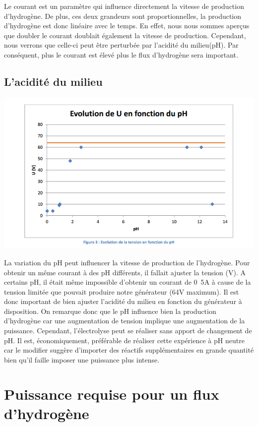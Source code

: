 \documentclass[10pt,a4paper]{article}
\begin{document}
Le courant est un paramètre qui influence directement la vitesse de production d'hydrogène. De plus, ces deux grandeurs sont proportionnelles, la production d'hydrogène est donc linéaire avec le temps. En effet, nous nous sommes aperçus que doubler le courant doublait également la vitesse de production. Cependant, nous verrons que celle-ci peut être perturbée par l'acidité du milieu(pH). Par conséquent, plus le courant est élevé plus le flux d'hydrogène sera important.


\subsection{L'acidité du milieu}

\includegraphics[scale=0.6]{poi.png} 


La variation du pH peut influencer la vitesse de production de l'hydrogène. Pour obtenir un même courant à des pH différents, il fallait ajuster la tension (V). A certains pH, il était même impossible d'obtenir un courant de \unit{0.5}{A} à cause de la tension limitée que pouvait produire notre générateur (\unit{64}{V} maximum). Il est donc important de bien ajuster l'acidité du milieu en fonction du générateur à disposition. On remarque donc que le pH influence bien la production d'hydrogène car une augmentation de tension implique une augmentation de la puissance. Cependant, l'électrolyse peut se réaliser sans apport de changement de pH. Il est, économiquement, préférable de réaliser cette expérience à pH neutre car le modifier suggère d'importer des réactifs supplémentaires en grande quantité bien qu'il faille imposer une puissance plus intense. 

\section{Puissance requise pour un flux d'hydrogène}
\end{document}
